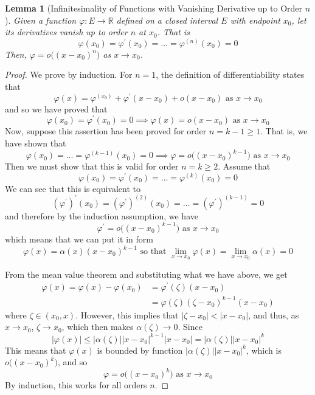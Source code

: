 \documentclass{article}
\newtheorem{lemma}[theorem]{Lemma}
\theoremstyle{remark}
\theoremstyle{definition}
\begin{document}
\begin{lemma}[Infinitesimality of Functions with Vanishing Derivative up to Order $n$]
Given a function $\varphi: E \longrightarrow \mathbb{R}$ defined on a closed interval $E$ with endpoint $x_0$, let its derivatives vanish up to order $n$ at $x_0$. That is
\[\varphi(x_0) = \varphi^\prime (x_0) = \ldots = \varphi^{(n)} (x_0) = 0\]
Then, $\varphi = o\big((x - x_0)^n\big)$ as $x \rightarrow x_0$. 
\end{lemma}
\begin{proof}
We prove by induction. For $n = 1$, the definition of differentiability states that 
\[\varphi(x) = \varphi^(x_0) + \varphi^\prime (x - x_0) + o(x - x_0) \text{ as } x \rightarrow x_0\]
and so we have proved that 
\[\varphi(x_0) = \varphi^\prime (x_0) = 0 \implies \varphi(x) = o(x - x_0) \text{ as } x \rightarrow x_0\]
Now, suppose this assertion has been proved for order $n = k - 1 \geq 1$. That is, we have shown that 
\[\varphi(x_0) = \ldots = \varphi^{(k-1)}(x_0) = 0 \implies \varphi= o\big((x - x_0)^{k-1}\big) \text{ as } x \rightarrow x_0\]
Then we must show that this is valid for order $n = k \geq 2$. Assume that 
\[\varphi(x_0) = \varphi^\prime (x_0) = \ldots = \varphi^{(k)} (x_0) = 0\]
We can see that this is equivalent to
\[(\varphi^\prime)^\prime (x_0) = (\varphi^\prime)^{(2)} (x_0) = \ldots = (\varphi^\prime)^{(k-1)} = 0\]
and therefore by the induction assumption, we have
\[\varphi^\prime = o\big( (x - x_0)^{k-1}\big) \text{ as } x \rightarrow x_0\]
which means that we can put it in form 
\[\varphi(x) = \alpha (x) (x - x_0)^{k-1} \text{ so that } \lim_{x \rightarrow x_0} \varphi(x) = \lim_{x \rightarrow x_0} \alpha(x) = 0 \]

From the mean value theorem and substituting what we have above, we get 
\begin{align*}
    \varphi(x) = \varphi(x) - \varphi(x_0) & = \varphi^\prime(\zeta) (x - x_0) \\
    & = \varphi (\zeta) (\zeta - x_0)^{k-1} (x - x_0)
\end{align*}
where $\zeta \in (x_0, x)$. However, this implies that $|\zeta - x_0| < |x - x_0|$, and thus, as $x \rightarrow x_0$, $\zeta \rightarrow x_0$, which then makes $\alpha(\zeta) \rightarrow 0$. Since
\[|\varphi (x)| \leq |\alpha(\zeta)| |x - x_0|^{k-1} |x - x_0| = |\alpha(\zeta)| |x - x_0|^k\]
This means that $\varphi(x)$ is bounded by function $|\alpha(\zeta)| |x - x_0|^k$, which is $o\big((x-x_0)^k\big)$, and so 
\[\varphi = o\big( (x - x_0)^k \big) \text{ as } x \rightarrow x_0\]
By induction, this works for all orders $n$. 
\end{proof}
\end{document}
